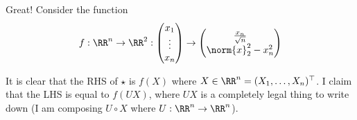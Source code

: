 \documentclass[11pt, headheight=30pt]{scrartcl}
\begin{document}

Great! Consider the function
\[
    f:\RR^n \to \RR^2: \begin{pmatrix}
        x_1\\
        \vdots\\
        x_n
    \end{pmatrix}
    \to \begin{pmatrix}
        \frac{x_n}{\sqrt{n}}\\
        \norm{x}_2^2 - x_n^2
    \end{pmatrix}    
\]

It is clear that the RHS of $\star$ is $f(X)$
where $X\in \RR^n = (X_1, \dots, X_n)^\top$.
I claim that the LHS is equal to $f(UX)$,
where $UX$ is a completely legal thing to write down
(I am composing $U\circ X$ where $U:\RR^n\to \RR^n$).
\end{document}
